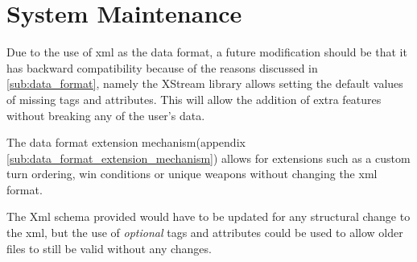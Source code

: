 \section{System Maintenance}

Due to the use of xml as the data format, a future modification should be that it has backward compatibility because of the reasons discussed in \ref{sub:data_format}, namely the XStream library allows setting the default values of missing tags and attributes. This will allow the addition of extra features without breaking any of the user's data. 

The data format extension mechanism(appendix \ref{sub:data_format_extension_mechanism}) allows for extensions such as a custom turn ordering, win conditions or unique weapons without changing the xml format.

The Xml schema provided would have to be updated for any structural change to the xml, but the use of \emph{optional} tags and attributes could be used to allow older files to still be valid without any changes. 

